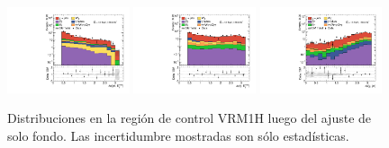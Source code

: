 \begin{figure}[ht!]
\begin{center}
   \includegraphics[width=0.32\textwidth]{images_tmp/results/fr2/can_VRM1H_dphi_jetmet_afterFit.pdf}
   \includegraphics[width=0.32\textwidth]{images_tmp/results/fr2/can_VRM1H_dphi_gammet_afterFit.pdf}
   \includegraphics[width=0.32\textwidth]{images_tmp/results/fr2/can_VRM1H_dphi_gamjet_afterFit.pdf}

   \caption{Distribuciones en la región de control VRM1H luego del ajuste de solo fondo. Las incertidumbre mostradas son sólo estadísticas.}
   \label{fig:dist_vrm1h_bkgonly}
 \end{center}
\end{figure}

